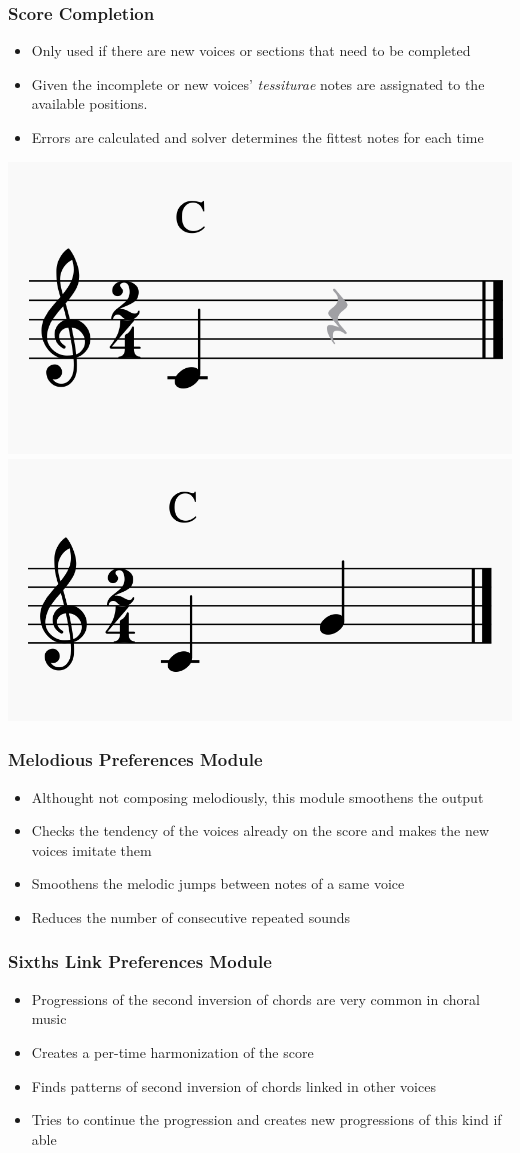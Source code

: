 \documentclass[english]{beamer}
\begin{document}
	\begin{frame}
	\frametitle{Score Completion}
	\begin{itemize}
		\item Only used if there are new voices or sections that need to be completed
		\item Given the incomplete or new voices' \textit{tessiturae} notes are assignated to the available positions.
		\item Errors are calculated and solver determines the fittest notes for each time
	\end{itemize}
		\begin{center}
				\includegraphics[width=0.39\linewidth]{imagenes/incomplete_score.png}
				\includegraphics[width=0.39\linewidth]{imagenes/completed_score.png}
		\end{center}
	\end{frame}
	\begin{frame}
	\frametitle{Melodious Preferences Module}
	\begin{itemize}
		\item Althought not composing melodiously, this module smoothens the output
		\item Checks the tendency of the voices already on the score and makes the new voices imitate them
		\item Smoothens the melodic jumps between notes of a same voice
		\item Reduces the number of consecutive repeated sounds
	\end{itemize}
	\end{frame}
	\begin{frame}
	\frametitle{Sixths Link Preferences Module}
	\begin{itemize}
		\item Progressions of the second inversion of chords are very common in choral music
		\item Creates a per-time harmonization of the score
		\item Finds patterns of second inversion of chords linked in other voices
		\item Tries to continue the progression and creates new progressions of this kind if able
	\end{itemize}
	\end{frame}
\end{document}
